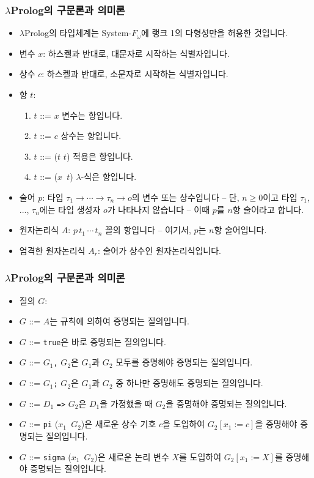 \documentclass[slidestop,compress,mathserif]{beamer}
\begin{document}
    \begin{frame}
        \frametitle{$\lambda$Prolog의 구문론과 의미론}
        \begin{itemize}
            \item $\lambda$Prolog의 타입체계는 System-$F_{\omega}$에 랭크 1의 다형성만을 허용한 것입니다.
            \item 변수 $x$: 하스켈과 반대로, 대문자로 시작하는 식별자입니다.
            \item 상수 $c$: 하스켈과 반대로, 소문자로 시작하는 식별자입니다.
            \item 항 $t$:
            \begin{enumerate}
                \item $t$ ::= $x$ 변수는 항입니다.
                \item $t$ ::= $c$ 상수는 항입니다.
                \item $t$ ::= ($t$ $t$) 적용은 항입니다.
                \item $t$ ::= ($x$\texttt{\string\ }$t$) $\lambda$-식은 항입니다.
            \end{enumerate}
            \item 술어 $p$: 타입 $ \tau_{1} \to \cdots \to \tau_{n} \to o $의 변수 또는 상수입니다 -- 단, $n \geq 0$이고 타입 $\tau_{1}$, ..., $\tau_{n}$에는 타입 생성자 $o$가 나타나지 않습니다 -- 이때 $p$를 $n$항 술어라고 합니다.
            \item 원자논리식 $A$: $p \, t_{1} \, \cdots \, t_{n}$ 꼴의 항입니다 -- 여기서, $p$는 $n$항 술어입니다.
            \item 엄격한 원자논리식 $A_r$: 술어가 상수인 원자논리식입니다.
        \end{itemize}
    \end{frame}

    \begin{frame}
        \frametitle{$\lambda$Prolog의 구문론과 의미론}
        \begin{itemize}
            \item 질의 $G$:
            \item $G$ ::= $A$는 규칙에 의하여 증명되는 질의입니다.
            \item $G$ ::= \texttt{true}은 바로 증명되는 질의입니다.
            \item $G$ ::= $G_1$\texttt{,} $G_2$은 $G_1$과 $G_2$ 모두를 증명해야 증명되는 질의입니다.
            \item $G$ ::= $G_1$\texttt{;} $G_2$은 $G_1$과 $G_2$ 중 하나만 증명해도 증명되는 질의입니다.
            \item $G$ ::= $D_1$ \texttt{=>} $G_2$은 $D_1$을 가정했을 때 $G_2$을 증명해야 증명되는 질의입니다.
            \item $G$ ::= \texttt{pi} ($x_1$\texttt{\string\ }$G_2$)은 새로운 상수 기호 $c$을 도입하여 $G_2 \left[ x_1 := c \right]$을 증명해야 증명되는 질의입니다.
            \item $G$ ::= \texttt{sigma} ($x_1$\texttt{\string\ }$G_2$)은 새로운 논리 변수 $X$를 도입하여 $G_2 \left[ x_1 := X \right]$를 증명해야 증명되는 질의입니다.
        \end{itemize}
    \end{frame}
\end{document}
